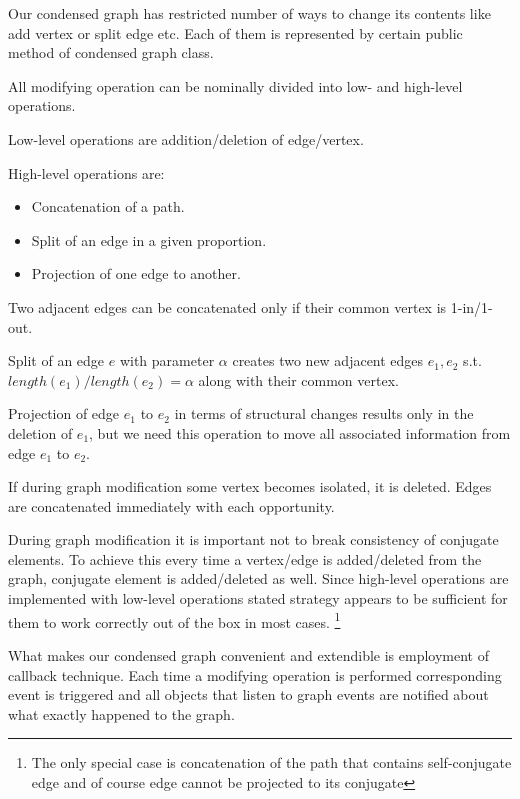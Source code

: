 \documentclass[12pt]{article}
\begin{document}
Our condensed graph has restricted number of ways to change its contents like add vertex or split edge etc. Each of them is represented by certain public method of condensed graph class.

All modifying operation can be nominally divided into low- and high-level operations.

Low-level operations are addition/deletion of edge/vertex.

High-level operations are:
\begin{itemize}
\item Concatenation of a path.
\item Split of an edge in a given proportion. 
\item Projection of one edge to another.
\end{itemize}

Two adjacent edges can be concatenated only if their common vertex is 1-in/1-out.

Split of an edge $e$ with parameter $\alpha$ creates two new adjacent edges $e_1, e_2$ s.t. $length(e_1)/length(e_2) = \alpha$ along with their common vertex.

Projection of edge $e_1$ to $e_2$ in terms of structural changes results only in the deletion of $e_1$, but we need this operation to move all associated information from edge $e_1$ to $e_2$.

If during graph modification some vertex becomes isolated, it is deleted. Edges are concatenated immediately with each opportunity.

During graph modification it is important not to break consistency of conjugate elements. 
To achieve this every time a vertex/edge is added/deleted from the graph, conjugate element is added/deleted as well.
Since high-level operations are implemented with low-level operations stated strategy appears to be sufficient for them to work correctly out of the box in most cases. \footnote{The only special case is concatenation of the path that contains self-conjugate edge and of course edge cannot be projected to its conjugate}


What makes our condensed graph convenient and extendible is employment of callback technique. Each time a modifying operation is performed corresponding event is triggered and all objects that listen to graph events are notified about what exactly happened to the graph.
\end{document}
